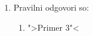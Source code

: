 \documentclass[11pt]{article}
\begin{document}
\begin{enumerate}
      \item Pravilni odgovori so: %
        \begin{enumerate}
          \item ">Primer 3"<
        \end{enumerate}
    
\end{enumerate}
\end{document}
